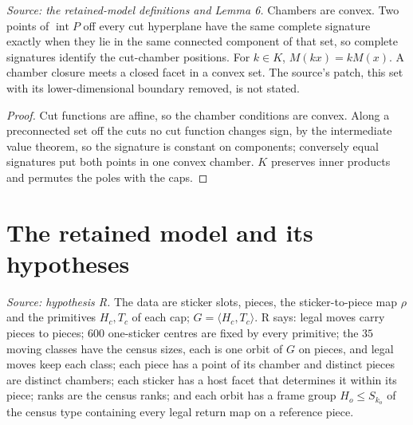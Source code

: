 \begin{theorem}
  \label{thm:signatures}
  \leanok
  \textit{Source: the retained-model definitions and Lemma 6.}
  Chambers are convex. Two points of \(\operatorname{int}P\) off every cut
  hyperplane have the same complete signature exactly when they lie in the
  same connected component of that set, so complete signatures identify
  the cut-chamber positions. For \(k\in K\), \(M(kx)=kM(x)\). A chamber
  closure meets a closed facet in a convex set. The source's patch, this
  set with its lower-dimensional boundary removed, is not stated.
\end{theorem}
\begin{proof}
  \leanok
  Cut functions are affine, so the chamber conditions are convex. Along a
  preconnected set off the cuts no cut function changes sign, by the
  intermediate value theorem, so the signature is constant on components;
  conversely equal signatures put both points in one convex chamber. \(K\)
  preserves inner products and permutes the poles with the caps.
\end{proof}

\section{The retained model and its hypotheses}

\begin{definition}
  \label{def:retained-model}
  \leanok
  \textit{Source: hypothesis R.}
  The data are sticker slots, pieces, the sticker-to-piece map \(\rho\) and
  the primitives \(H_c,T_c\) of each cap; \(G=\langle H_c,T_c\rangle\). R
  says: legal moves carry pieces to pieces; \(600\) one-sticker centres
  are fixed by every primitive; the \(35\) moving classes have the census
  sizes, each is one orbit of \(G\) on pieces, and legal moves keep each
  class; each piece has a point of its chamber and distinct pieces are
  distinct chambers; each sticker has a host facet that determines it
  within its piece; ranks are the census ranks; and each orbit has a frame
  group \(H_o\le S_{k_o}\) of the census type containing every legal
  return map on a reference piece.
\end{definition}


